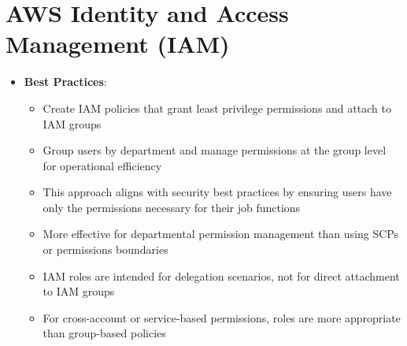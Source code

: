 \documentclass[11pt,a4paper]{report}
\begin{document}
\section{AWS Identity and Access Management (IAM)}

\begin{itemize}
  \item \textbf{Best Practices}:
\begin{itemize}
  \item Create IAM policies that grant least privilege permissions and attach to IAM groups
  \item Group users by department and manage permissions at the group level for operational efficiency
  \item This approach aligns with security best practices by ensuring users have only the permissions necessary for their job functions
  \item More effective for departmental permission management than using SCPs or permissions boundaries
  \item IAM roles are intended for delegation scenarios, not for direct attachment to IAM groups
  \item For cross-account or service-based permissions, roles are more appropriate than group-based policies
\end{itemize}
\end{itemize}
\end{document}
